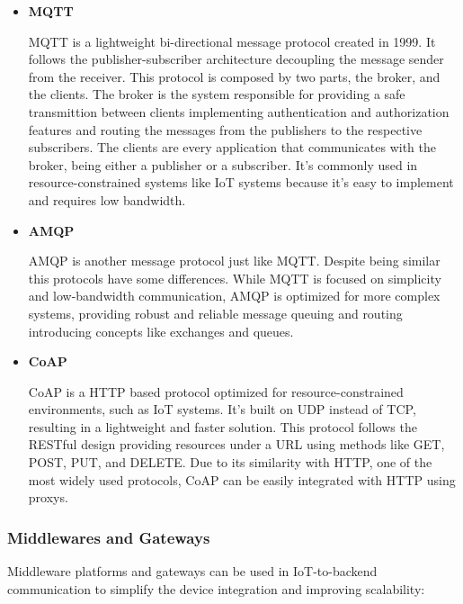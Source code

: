 \begin{itemize}

	\item \textbf{MQTT}

	      MQTT is a lightweight bi-directional message protocol created in 1999.
	      It follows the publisher-subscriber architecture decoupling the message
	      sender from the receiver. This protocol is composed by two parts, the
	      broker, and the clients. The broker is the system responsible for providing
	      a safe transmittion between clients implementing authentication and
	      authorization features and routing the messages from the publishers to
	      the respective subscribers. The clients are every application that
	      communicates with the broker, being either a publisher or a subscriber.
	      It's commonly used in resource-constrained systems like IoT systems because
	      it's easy to implement and requires low bandwidth.

	\item \textbf{AMQP}

	      \gls{AMQP} is another message protocol just like \gls{MQTT}.
	      Despite being similar this protocols have some differences. While \gls{MQTT} is
	      focused on simplicity and low-bandwidth communication, \gls{AMQP} is optimized for
	      more complex systems, providing robust and reliable message queuing and
	      routing introducing concepts like exchanges and queues.


	\item \textbf{\gls{CoAP}}

	      \gls{CoAP} is a \gls{HTTP} based protocol optimized for resource-constrained
	      environments, such as \gls{IoT} systems. It's built on \gls{UDP} instead of \gls{TCP},
	      resulting in a lightweight and faster solution.
	      This protocol follows the \gls{REST}ful design providing resources under a \gls{URL}
	      using methods like GET, POST, PUT, and DELETE. Due to its similarity with
	      \gls{HTTP}, one of the most widely used protocols, \gls{CoAP} can be easily integrated
	      with \gls{HTTP} using proxys.

\end{itemize}

\subsubsection{Middlewares and Gateways}
Middleware platforms and gateways can be used in \gls{IoT}-to-backend
communication to simplify the device integration and improving scalability:


